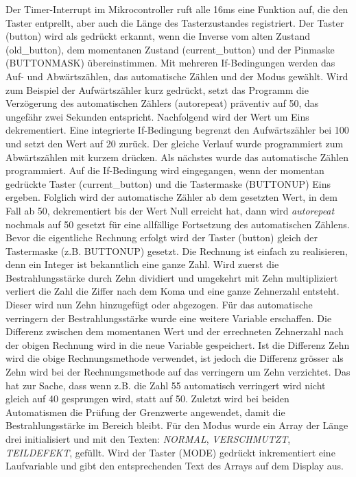 Der Timer-Interrupt im Mikrocontroller ruft alle 16ms eine Funktion auf, die den Taster entprellt, aber auch die Länge des Tasterzustandes registriert.
Der Taster (button) wird als gedrückt erkannt, wenn die Inverse vom alten Zustand (old\_button), dem momentanen Zustand (current\_button) und der Pinmaske (BUTTONMASK) übereinstimmen.
Mit mehreren If-Bedingungen werden das Auf- und Abwärtszählen, das automatische Zählen und der Modus gewählt. Wird zum Beispiel der Aufwärtszähler kurz gedrückt, setzt das Programm die Verzögerung des automatischen Zählers (autorepeat) präventiv auf 50, das ungefähr zwei Sekunden entspricht. Nachfolgend wird der Wert um Eins dekrementiert. Eine integrierte If-Bedingung begrenzt den Aufwärtszähler bei 100 und setzt den Wert auf 20 zurück.
\newline
Der gleiche Verlauf wurde programmiert zum Abwärtszählen mit kurzem drücken.
\newline
Als nächstes wurde das automatische Zählen programmiert. Auf die If-Bedingung wird eingegangen, wenn der momentan gedrückte Taster (current\_button) und die Tastermaske (BUTTONUP) Eins ergeben. Folglich wird der automatische Zähler ab dem gesetzten Wert, in dem Fall ab 50, dekrementiert bis der Wert Null erreicht hat, dann wird \textit{autorepeat} nochmals auf 50 gesetzt für eine allfällige Fortsetzung des automatischen Zählens.
\newline
Bevor die eigentliche Rechnung erfolgt wird der Taster (button) gleich der Tastermaske (z.B. BUTTONUP) gesetzt. Die Rechnung ist einfach zu realisieren, denn ein Integer ist bekanntlich eine ganze Zahl. Wird zuerst die Bestrahlungsstärke durch Zehn dividiert und umgekehrt mit Zehn multipliziert verliert die Zahl die Ziffer nach dem Koma und eine ganze Zehnerzahl entsteht. Dieser wird nun Zehn hinzugefügt oder abgezogen.
\newline
Für das automatische verringern der Bestrahlungsstärke wurde eine weitere Variable erschaffen. Die Differenz zwischen dem momentanen Wert und der errechneten Zehnerzahl nach der obigen Rechnung wird in die neue Variable gespeichert. Ist die Differenz Zehn wird die obige Rechnungsmethode verwendet, ist jedoch die Differenz grösser als Zehn wird bei der Rechnungsmethode auf das verringern um Zehn verzichtet. Das hat zur Sache, dass wenn z.B. die Zahl 55 automatisch verringert wird nicht gleich auf 40 gesprungen wird, statt auf 50. Zuletzt wird bei beiden Automatismen die Prüfung der Grenzwerte angewendet, damit die Bestrahlungsstärke im Bereich bleibt.
\newline
Für den Modus wurde ein Array der Länge drei initialisiert und mit den Texten: \textit{NORMAL}, \textit{VERSCHMUTZT}, \textit{TEILDEFEKT}, gefüllt. Wird der Taster (MODE) gedrückt inkrementiert eine Laufvariable und gibt den entsprechenden Text des Arrays auf dem Display aus.